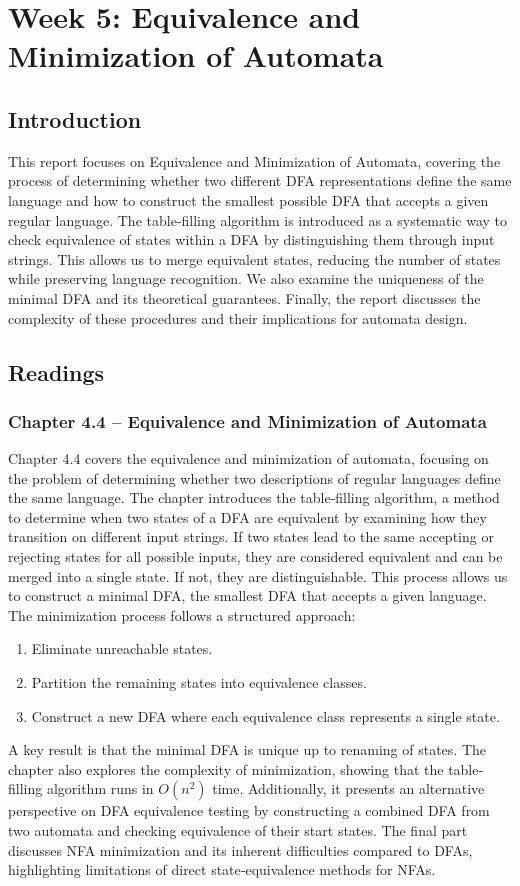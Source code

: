 \documentclass{article}
\theoremstyle{theorem}
\theoremstyle{definition}
\theoremstyle{remark}
\begin{document}
\newpage

\section{Week 5: Equivalence and Minimization of Automata}

\subsection{Introduction}
This report focuses on Equivalence and Minimization of Automata, covering the process of determining whether two different DFA representations define the same language and how to construct the smallest possible DFA that accepts a given regular language. The table‐filling algorithm is introduced as a systematic way to check equivalence of states within a DFA by distinguishing them through input strings. This allows us to merge equivalent states, reducing the number of states while preserving language recognition. We also examine the uniqueness of the minimal DFA and its theoretical guarantees. Finally, the report discusses the complexity of these procedures and their implications for automata design.

\subsection{Readings}

\subsubsection*{Chapter 4.4 – Equivalence and Minimization of Automata}
Chapter 4.4 covers the equivalence and minimization of automata, focusing on the problem of determining whether two descriptions of regular languages define the same language. The chapter introduces the table‐filling algorithm, a method to determine when two states of a DFA are equivalent by examining how they transition on different input strings. If two states lead to the same accepting or rejecting states for all possible inputs, they are considered equivalent and can be merged into a single state. If not, they are distinguishable. This process allows us to construct a minimal DFA, the smallest DFA that accepts a given language. The minimization process follows a structured approach:
\begin{enumerate}
  \item Eliminate unreachable states.
  \item Partition the remaining states into equivalence classes.
  \item Construct a new DFA where each equivalence class represents a single state.
\end{enumerate}
A key result is that the minimal DFA is unique up to renaming of states. The chapter also explores the complexity of minimization, showing that the table‐filling algorithm runs in \(O(n^2)\) time. Additionally, it presents an alternative perspective on DFA equivalence testing by constructing a combined DFA from two automata and checking equivalence of their start states. The final part discusses NFA minimization and its inherent difficulties compared to DFAs, highlighting limitations of direct state‐equivalence methods for NFAs.
\end{document}
